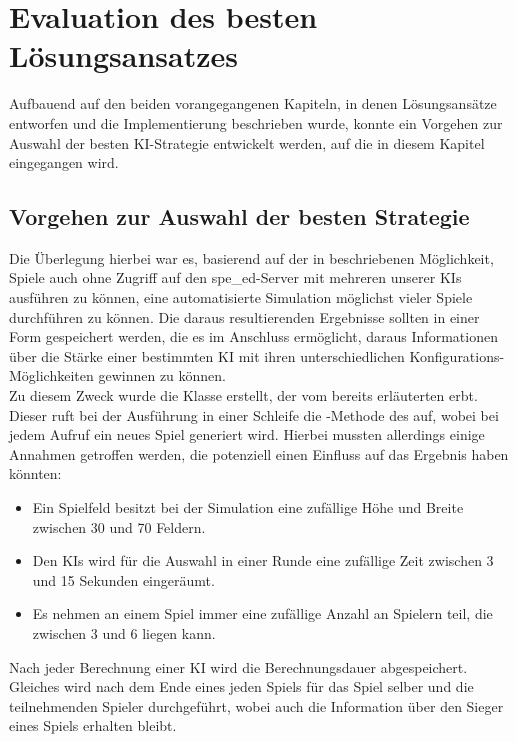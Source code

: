 \chapter{Evaluation des besten Lösungsansatzes}
\label{ch:evaluation-loesungsansatz}

Aufbauend auf den beiden vorangegangenen Kapiteln, in denen Lösungsansätze entworfen und die Implementierung
beschrieben wurde, konnte ein Vorgehen zur Auswahl der besten \ac{KI}-Strategie entwickelt werden, auf die in diesem
Kapitel eingegangen wird.

\section{Vorgehen zur Auswahl der besten Strategie}
\label{sec:auswahl-strategie}

Die Überlegung hierbei war es, basierend auf der in  beschriebenen
Möglichkeit, Spiele auch ohne Zugriff auf den spe\_ed-Server mit mehreren unserer \ac{KI}s ausführen zu können,
eine automatisierte Simulation möglichst vieler Spiele durchführen zu können.
Die daraus resultierenden Ergebnisse sollten in einer Form gespeichert werden, die es im Anschluss ermöglicht, daraus
Informationen über die Stärke einer bestimmten \ac{KI} mit ihren unterschiedlichen Konfigurations-Möglichkeiten gewinnen
zu können. \\

Zu diesem Zweck wurde die Klasse  erstellt, der vom bereits erläuterten
 erbt.
Dieser ruft bei der Ausführung in einer Schleife die -Methode des  auf, wobei bei
jedem Aufruf ein neues Spiel generiert wird.
Hierbei mussten allerdings einige Annahmen getroffen werden, die potenziell einen Einfluss auf das Ergebnis haben
könnten:

\begin{itemize}
    \item Ein Spielfeld besitzt bei der Simulation eine zufällige Höhe und Breite zwischen 30 und 70 Feldern.
    \item Den \ac{KI}s wird für die Auswahl in einer Runde eine zufällige Zeit zwischen 3 und 15 Sekunden eingeräumt.
    \item Es nehmen an einem Spiel immer eine zufällige Anzahl an Spielern teil, die zwischen 3 und 6 liegen kann.
\end{itemize}

Nach jeder Berechnung einer \ac{KI} wird die Berechnungsdauer abgespeichert.
Gleiches wird nach dem Ende eines jeden Spiels für das Spiel selber und die teilnehmenden Spieler durchgeführt, wobei
auch die Information über den Sieger eines Spiels erhalten bleibt.

